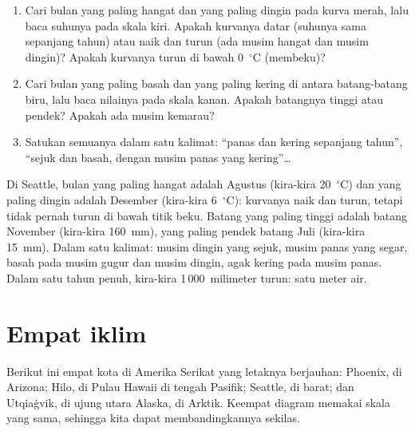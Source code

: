 \begin{method}\label{met:g5:weather-and-climate:reading}
\begin{enumerate}
  \item Cari bulan yang paling hangat dan yang paling dingin pada kurva
        merah, lalu baca suhunya pada skala kiri. Apakah kurvanya datar
        (suhunya sama sepanjang tahun) atau naik dan turun (ada musim hangat
        dan musim dingin)? Apakah kurvanya turun di bawah 0~$^\circ$C
        (membeku)?
  \item Cari bulan yang paling basah dan yang paling kering di antara
        batang-batang biru, lalu baca nilainya pada skala kanan. Apakah
        batangnya tinggi atau pendek? Apakah ada musim kemarau?
  \item Satukan semuanya dalam satu kalimat: ``panas dan kering sepanjang
        tahun'', ``sejuk dan basah, dengan musim panas yang kering''{\ldots}
\end{enumerate}
\end{method}

\begin{example}[Seattle]\label{ex:g5:weather-and-climate:seattle}
Di Seattle, bulan yang paling hangat adalah Agustus (kira-kira
20~$^\circ$C) dan yang paling dingin adalah Desember (kira-kira
6~$^\circ$C): kurvanya naik dan turun, tetapi tidak pernah turun di bawah
titik beku. Batang yang paling tinggi adalah batang November (kira-kira
160~mm), yang paling pendek batang Juli (kira-kira 15~mm). Dalam satu
kalimat: musim dingin yang sejuk, musim panas yang segar, basah pada musim
gugur dan musim dingin, agak kering pada musim panas. Dalam satu tahun
penuh, kira-kira 1\,000~milimeter  turun: satu meter air.
\end{example}

\section{Empat iklim}

Berikut ini  empat kota di Amerika Serikat yang letaknya
berjauhan: Phoenix, di  Arizona; Hilo, di Pulau Hawaii di tengah
 Pasifik; Seattle, di  barat; dan Utqiaġvik, di ujung utara
Alaska, di   Arktik. Keempat diagram memakai skala yang sama,
sehingga kita dapat membandingkannya sekilas.


